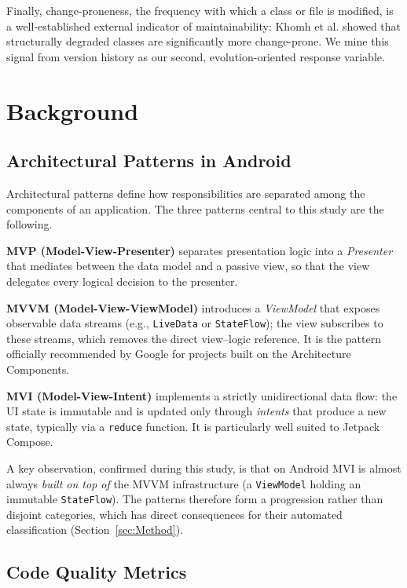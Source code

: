 \documentclass[conference]{IEEEtran}
\begin{document}
Finally, change-proneness, the frequency with which a class or file is modified,
is a well-established external indicator of maintainability: Khomh et al.
\cite{Khomh:2009} showed that structurally degraded classes are significantly
more change-prone. We mine this signal from version history as our second,
evolution-oriented response variable.

\section{Background} \label{sec:Background}

\subsection{Architectural Patterns in Android}

Architectural patterns define how responsibilities are separated among the
components of an application. The three patterns central to this study are the
following.

\textbf{MVP (Model-View-Presenter)} separates presentation logic into a
\textit{Presenter} that mediates between the data model and a passive view, so
that the view delegates every logical decision to the presenter.

\textbf{MVVM (Model-View-ViewModel)} introduces a \textit{ViewModel} that exposes
observable data streams (e.g., \texttt{LiveData} or \texttt{StateFlow}); the view
subscribes to these streams, which removes the direct view--logic reference. It
is the pattern officially recommended by Google for projects built on the
Architecture Components.

\textbf{MVI (Model-View-Intent)} implements a strictly unidirectional data flow:
the UI state is immutable and is updated only through \textit{intents} that
produce a new state, typically via a \texttt{reduce} function. It is particularly
well suited to Jetpack Compose.

A key observation, confirmed during this study, is that on Android MVI is almost
always \emph{built on top of} the MVVM infrastructure (a \texttt{ViewModel}
holding an immutable \texttt{StateFlow}). The patterns therefore form a
progression rather than disjoint categories, which has direct consequences for
their automated classification (Section~\ref{sec:Method}).

\subsection{Code Quality Metrics}
\end{document}
